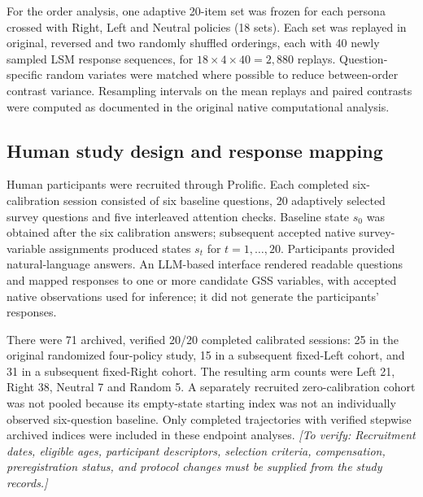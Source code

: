 \documentclass[11pt]{article}
\newcommand{\pending}[1]{\textit{[To verify: #1]}}
\begin{document}
For the order analysis, one adaptive 20-item set was frozen for each persona crossed with Right, Left and Neutral policies (18 sets). Each set was replayed in original, reversed and two randomly shuffled orderings, each with 40 newly sampled LSM response sequences, for $18\times4\times40=2,880$ replays. Question-specific random variates were matched where possible to reduce between-order contrast variance. Resampling intervals on the mean replays and paired contrasts were computed as documented in the original native computational analysis.

\subsection*{Human study design and response mapping}
Human participants were recruited through Prolific. Each completed six-calibration session consisted of six baseline questions, 20 adaptively selected survey questions and five interleaved attention checks. Baseline state $s_0$ was obtained after the six calibration answers; subsequent accepted native survey-variable assignments produced states $s_t$ for $t=1,\ldots,20$. Participants provided natural-language answers. An LLM-based interface rendered readable questions and mapped responses to one or more candidate GSS variables, with accepted native observations used for inference; it did not generate the participants' responses.

There were 71 archived, verified 20/20 completed calibrated sessions: 25 in the original randomized four-policy study, 15 in a subsequent fixed-Left cohort, and 31 in a subsequent fixed-Right cohort. The resulting arm counts were Left 21, Right 38, Neutral 7 and Random 5. A separately recruited zero-calibration cohort was not pooled because its empty-state starting index was not an individually observed six-question baseline. Only completed trajectories with verified stepwise archived indices were included in these endpoint analyses. \pending{Recruitment dates, eligible ages, participant descriptors, selection criteria, compensation, preregistration status, and protocol changes must be supplied from the study records.}
\end{document}
